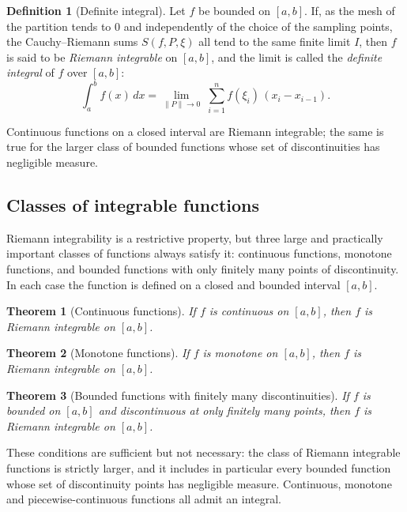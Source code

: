 \documentclass[11pt,a4paper]{article}
\theoremstyle{definition} \newtheorem{definition}{Definition} \theoremstyle{plain} \newtheorem{theorem}{Theorem}
\begin{document}
\begin{definition}[Definite integral] Let $f$ be bounded on $[a,b]$.
If, as the mesh of the partition tends to $0$ and independently of the choice of the sampling points, the Cauchy--Riemann sums $S(f,P,\xi)$ all tend to the same finite limit $I$, then $f$ is said to be \emph{Riemann integrable} on $[a,b]$, and the limit is called the \emph{definite integral} of $f$ over $[a,b]$: \[ \int_a^b f(x)\,dx = \lim_{\|P\|\to 0}\;\sum_{i=1}^{n} f(\xi_i)\,(x_i-x_{i-1}). \] \end{definition}
Continuous functions on a closed interval are Riemann integrable; the same is true for the larger class of bounded functions whose set of discontinuities has negligible measure.
\subsection{Classes of integrable functions}
Riemann integrability is a restrictive property, but three large and practically important classes of functions always satisfy it: continuous functions, monotone functions, and bounded functions with only finitely many points of discontinuity.
In each case the function is defined on a closed and bounded interval $[a,b]$.
\begin{theorem}[Continuous functions]\label{thm:continuous-integrable} If $f$ is continuous on $[a,b]$, then $f$ is Riemann integrable on $[a,b]$. \end{theorem}
\begin{theorem}[Monotone functions]\label{thm:monotone-integrable} If $f$ is monotone on $[a,b]$, then $f$ is Riemann integrable on $[a,b]$. \end{theorem}
\begin{theorem}[Bounded functions with finitely many discontinuities]\label{thm:finite-discontinuities} If $f$ is bounded on $[a,b]$ and discontinuous at only finitely many points, then $f$ is Riemann integrable on $[a,b]$. \end{theorem}
These conditions are sufficient but not necessary: the class of Riemann integrable functions is strictly larger, and it includes in particular every bounded function whose set of discontinuity points has negligible measure. Continuous, monotone and piecewise-continuous functions all admit an integral.
\end{document}

